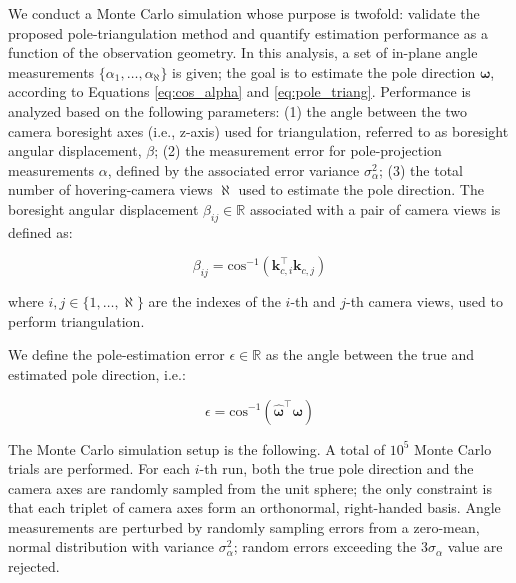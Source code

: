 We conduct a Monte Carlo simulation whose purpose is twofold: validate the proposed pole-triangulation method and quantify estimation performance as a function of the observation geometry. In this analysis, a set of in-plane angle measurements $\{ \alpha_1, \dots, \alpha_\aleph \}$ is given; the goal is to estimate the pole direction $\boldsymbol{\omega}$, according to Equations \ref{eq:cos_alpha} and \ref{eq:pole_triang}. Performance is analyzed based on the following parameters: (1) the angle between the two camera boresight axes (i.e., z-axis) used for triangulation, referred to as boresight angular displacement, $\beta$; (2) the measurement error for pole-projection measurements $\alpha$, defined by the associated error variance $\sigma_\alpha^2$; (3) the total number of hovering-camera views $\aleph$ used to estimate the pole direction. The boresight angular displacement $\beta_{ij}\in\mathbb{R}$ associated with a pair of camera views is defined as:

\begin{equation}
    \beta_{ij} = \mathrm{cos}^{-1}(\mathbf{k}_{c,i}^\top \mathbf{k}_{c,j})
\end{equation}

where $i,j\in\{1,\dots,\aleph\}$ are the indexes of the $i$-th and $j$-th camera views, used to perform triangulation.

We define the pole-estimation error $\epsilon\in\mathbb{R}$ as the angle between the true and estimated pole direction, i.e.:

\begin{equation}
    \epsilon = \mathrm{cos}^{-1}(\hat{\boldsymbol{\omega}}^\top\boldsymbol{\omega})
\end{equation}

The Monte Carlo simulation setup is the following. A total of $10^5$ Monte Carlo trials are performed. For each $i$-th run, both the true pole direction and the camera axes are randomly sampled from the unit sphere; the only constraint is that each triplet of camera axes form an orthonormal, right-handed basis. Angle measurements are perturbed by randomly sampling errors from a zero-mean, normal distribution with variance $\sigma_\alpha^2$; random errors exceeding the $3\sigma_\alpha$ value are rejected.

